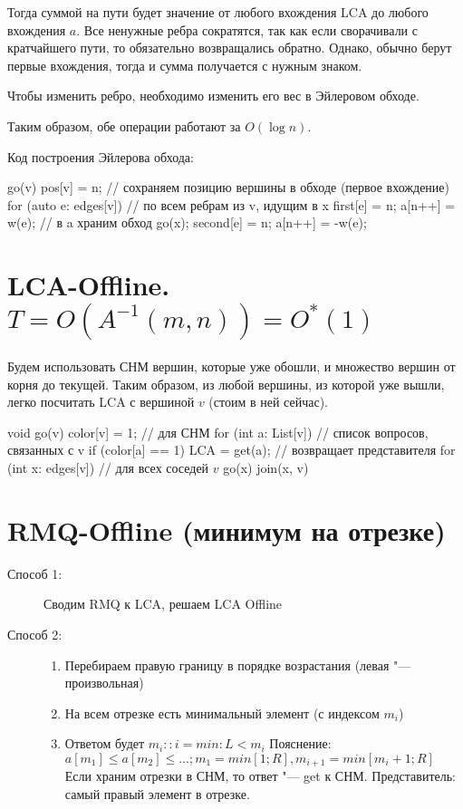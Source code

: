Тогда суммой на пути будет значение от любого вхождения LCA до любого вхождения $a$.
Все ненужные ребра сократятся, так как если сворачивали с кратчайшего пути, то обязательно возвращались обратно.
Однако, обычно берут первые вхождения, тогда и сумма получается с нужным знаком.

Чтобы изменить ребро, необходимо изменить его вес в Эйлеровом обходе.

Таким образом, обе операции работают за $O(\log n)$.

Код построения Эйлерова обхода:

\begin{cppcode}
go(v) {
	pos[v] = n; // сохраняем позицию вершины в обходе (первое вхождение)
	for (auto e: edges[v]) { // по всем ребрам из v, идущим в x
		first[e] = n;
		a[n++] = w(e); // в a храним обход
		go(x);
		second[e] = n;
		a[n++] = -w(e);
	}
}
\end{cppcode}

\section{LCA-Offline. \texorpdfstring{$T = O\left(A^{-1}(m, n)\right) = O^*\left(1\right)$}{T = O(A\^{}-1(m, n)) = O*(1)}}

Будем использовать СНМ вершин, которые уже обошли, и множество вершин от корня до текущей.
Таким образом, из любой вершины, из которой уже вышли, легко посчитать LCA с вершиной $v$ (стоим в ней сейчас).


\begin{cppcode}
void go(v) {
	color[v] = 1; // для СНМ
	for (int a: List[v]) // список вопросов, связанных с v
		if (color[a] == 1)
			LCA = get(a); // возвращает представителя
	for (int x: edges[v]) { // для всех соседей $v$
		go(x)
		join(x, v)
	}
}
\end{cppcode}

\section{RMQ-Offline (минимум на отрезке)}

\begin{description}
\item[Способ 1:]
	Сводим RMQ к LCA, решаем LCA Offline

\item[Способ 2:]
	\begin{enumerate}
	\item
		Перебираем правую границу в порядке возрастания (левая "--- произвольная)

	\item
		На всем отрезке есть минимальный элемент (с индексом $m_i$)

	\item
		Ответом будет $m_i\colon: i = min: L < m_i$
		Пояснение:   $a[m_1] \le a[m_2] \le ...; m_1 = 	{min}[1; R], m_{i+1} = 	{min}[m_i + 1; R]$
		Если храним отрезки в СНМ, то ответ "--- get к СНМ. Представитель: самый правый элемент в отрезке.
	\end{enumerate}
\end{description}

